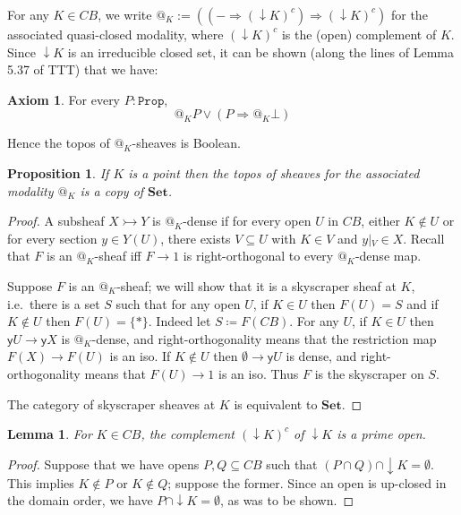 \documentclass[11pt, oneside, article]{memoir}
\makeatletter
\theoremstyle{plain}
\newtheorem{proposition}[theorem]{Proposition}
\newtheorem{lemma}[theorem]{Lemma}
\theoremstyle{definition}
\newtheorem{axiom}{Axiom}
\theoremstyle{remark}
\renewcommand{\ss}{\subseteq}
\newcommand{\const}[1]{\mathtt{#1}}
\newcommand{\Cat}[1]{\mathbf{#1}}
\newcommand{\Fun}[1]{\mathsf{#1}}
\newcommand{\smset}{\Cat{Set}}
\newcommand{\inj}{\rightarrowtail}
\newcommand{\yoneda}{\Fun{y}}
\newcommand{\Prop}{\const{Prop}}
\newcommand{\restrict}[2]{#1\big|\hspace{0in}_{#2}}
\newcommand{\BaseSpace}{B}
\newcommand{\AtSymbol}{{@}}
\newcommand{\At}[2][]{\AtSymbol^{#1}_{#2}}
\newcommand{\imp}{\Rightarrow}
\makeatother
\begin{document}
For any $K\in CB$, we write $\At{K} := ((- \imp (\downarrow K)^c) \imp (\downarrow K)^c)$ for the associated quasi-closed modality, where $(\downarrow K)^c$ is the (open) complement of $K$. Since $\downarrow K$ is an irreducible closed set, it can be shown (along the lines of Lemma 5.37 of TTT) that we have:

\begin{axiom}\label{ax.atBoolean}
For every $P : \Prop$,
\[
	\At{K} P \lor (P \imp \At{K} \bot)
\]
\end{axiom}

Hence the topos of $\At{K}$-sheaves is Boolean.

\begin{proposition}
If $K$ is a point then the topos of sheaves for the associated modality $\At{K}$ is a copy of $\smset$.
\end{proposition}
\begin{proof}
A subsheaf $X\inj Y$ is $\At{K}$-dense if for every open $U$ in $C\BaseSpace$, either $K\not\in U$ or for every section $y\in Y(U)$, there exists $V\ss U$ with $K\in V$ and $\restrict{y}{V}\in X$. Recall that $F$ is an $\At{K}$-sheaf iff $F\to 1$ is right-orthogonal to every $\At{K}$-dense map.

Suppose $F$ is an $\At{K}$-sheaf; we will show that it is a skyscraper sheaf at $K$, i.e.\ there is a set $S$ such that for any open $U$, if $K\in U$ then $F(U)=S$ and if $K\not\in U$ then $F(U)=\{*\}$. Indeed let $S\coloneqq F(C\BaseSpace)$. For any $U$, if $K\in U$ then $\yoneda U\to\yoneda X$ is $\At{K}$-dense, and right-orthogonality means that the restriction map $F(X)\to F(U)$ is an iso. If $K\not\in U$ then $\emptyset\to\yoneda U$ is dense, and right-orthogonality means that $F(U)\to 1$ is an iso. Thus $F$ is the skyscraper on $S$.

The category of skyscraper sheaves at $K$ is equivalent to $\smset$.
\end{proof}

\begin{lemma}
For $K\in C\BaseSpace$, the complement $(\downarrow K)^c$ of $\downarrow K$ is a prime open.
\label{lem.prime}
\end{lemma}

\begin{proof}
Suppose that we have opens $P,Q\subseteq C\BaseSpace$ such that $(P\cap Q)\cap \downarrow K = \emptyset$. This implies $K\not\in P$ or $K\not\in Q$; suppose the former. Since an open is up-closed in the domain order, we have $P\cap \downarrow K = \emptyset$, as was to be shown.
\end{proof}
\end{document}
